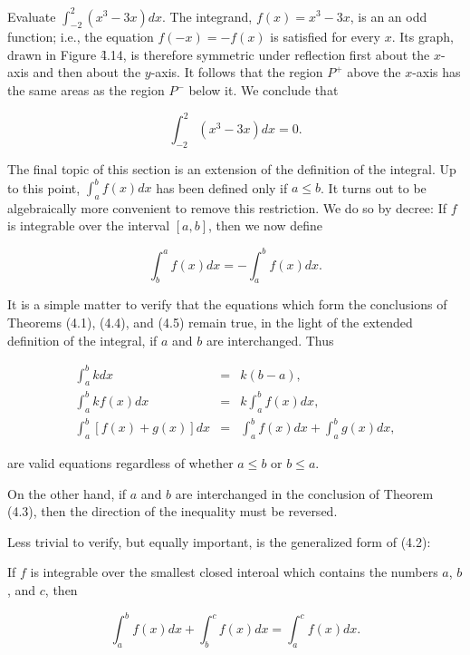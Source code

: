 
\begin{example}
Evaluate $\int_{-2}^{2} (x^3 - 3x) dx$. The integrand, $f(x) = x^3 - 3x$, is an an odd function; i.e., the equation $f(- x) = - f(x)$ is satisfied for every $x$. Its graph, drawn in Figure \f{4.14}, is therefore symmetric under reflection first about the $x$-axis and then about the $y$-axis. It follows that the region $P^{+}$ above the $x$-axis has the same areas as the region $P^{-}$ below it. 
We conclude that

$$
\int_{-2}^{2} (x^3 - 3x) dx = 0.
$$
\end{example}


The final topic of this section is an extension of the definition of the integral. Up to this point, $\int_{a}^{b} f(x) dx$ has been defined only if $a \leq b$. It turns out to be algebraically more convenient to remove this restriction. We do so by decree: If $f$ is integrable over the interval $[a, b]$, then we now define 

\begin{equation}
\int_{b}^{a} f(x) dx = - \int_{a}^{b} f(x) dx.
\label{eq4.4.4}
\end{equation}

It is a simple matter to verify that the equations which form the conclusions of Theorems (4.1), (4.4), and (4.5) remain true, in the light of the extended definition of the integral, if $a$ and $b$ are interchanged. Thus

\begin{eqnarray*}
                \int_{a}^{b} k dx &=& k(b - a),\\
           \int_{a}^{b} k f(x)dx &=& k\int_{a}^{b} f(x) dx,\\
\int_{a}^{b} [f (x) + g(x)] dx &=& \int_{a}^{b} f (x) dx + \int_{a}^{b} g(x) dx,
\end{eqnarray*}

\noindent are valid equations regardless of whether $a \leq b$ or $b \leq a$.

On the other hand, if $a$ and $b$ are interchanged in the conclusion of Theorem (4.3), then the direction of the inequality must be reversed.

Less trivial to verify, but equally important, is the generalized form of (4.2):


\begin{theorem} %
\label{thm 4.4.7}
If $f$ is integrable over the smallest closed interoal which contains the numbers $a$, $b$, and $c$, then

$$
\int_{a}^{b} f(x)dx + \int_{b}^{c} f(x)dx = \int_{a}^{c} f(x)dx.
$$
\end{theorem}

